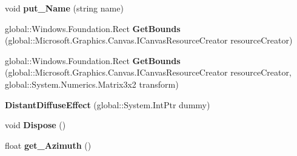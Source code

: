 \begin{DoxyCompactItemize}
\mbox{\label{class_microsoft_1_1_graphics_1_1_canvas_1_1_effects_1_1_distant_diffuse_effect_a793a85913c14d1fd90f31d8419e31304}} 
void {\bfseries put\+\_\+\+Name} (string name)
\item 
\mbox{\label{class_microsoft_1_1_graphics_1_1_canvas_1_1_effects_1_1_distant_diffuse_effect_a1cb8c03778e97d9bc464859b2d31a0f9}} 
global\+::\+Windows.\+Foundation.\+Rect {\bfseries Get\+Bounds} (global\+::\+Microsoft.\+Graphics.\+Canvas.\+I\+Canvas\+Resource\+Creator resource\+Creator)
\item 
\mbox{\label{class_microsoft_1_1_graphics_1_1_canvas_1_1_effects_1_1_distant_diffuse_effect_a285663b04cb7fc7b35148015b81d8e72}} 
global\+::\+Windows.\+Foundation.\+Rect {\bfseries Get\+Bounds} (global\+::\+Microsoft.\+Graphics.\+Canvas.\+I\+Canvas\+Resource\+Creator resource\+Creator, global\+::\+System.\+Numerics.\+Matrix3x2 transform)
\item 
\mbox{\label{class_microsoft_1_1_graphics_1_1_canvas_1_1_effects_1_1_distant_diffuse_effect_a22bc8ecf39b5603009d3e448ec80f51e}} 
{\bfseries Distant\+Diffuse\+Effect} (global\+::\+System.\+Int\+Ptr dummy)
\item 
\mbox{\label{class_microsoft_1_1_graphics_1_1_canvas_1_1_effects_1_1_distant_diffuse_effect_ac2c02091c4129fd0d1920421b4a2d61c}} 
void {\bfseries Dispose} ()
\item 
\mbox{\label{class_microsoft_1_1_graphics_1_1_canvas_1_1_effects_1_1_distant_diffuse_effect_a98e18ca607a8980f03052a0b7395d04d}} 
float {\bfseries get\+\_\+\+Azimuth} ()
\item 
\mbox{\label{class_microsoft_1_1_graphics_1_1_canvas_1_1_effects_1_1_distant_diffuse_effect_ae114aba55a21ce453abc28d14c8571e5}} 

\end{DoxyCompactItemize}
